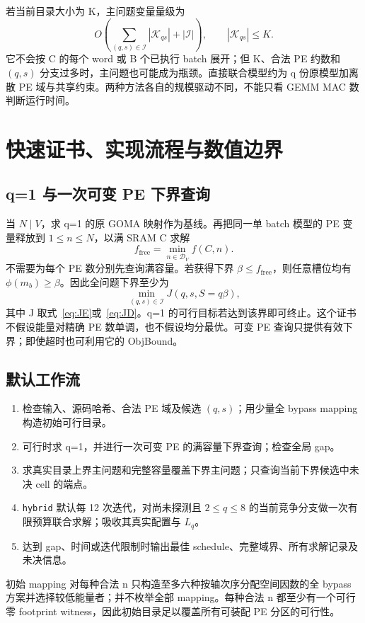 \documentclass[UTF8,11pt,a4paper,fontset=fandol]{ctexart}
\theoremstyle{remark}\newtheorem{remark}[proposition]{说明}
\numberwithin{equation}{section}
\begin{document}
若当前目录大小为 K，主问题变量量级为
\begin{equation}
O\left(\sum_{(q,s)\in\mathcal I}|\mathcal K_{qs}|+|\mathcal I|\right),
\qquad |\mathcal K_{qs}|\le K.
\end{equation}
它不会按 C 的每个 word 或 B 个已执行 batch 展开；但 K、合法 PE 约数和 $(q,s)$ 分支过多时，主问题也可能成为瓶颈。直接联合模型约为 q 份原模型加离散 PE 域与共享约束。两种方法各自的规模驱动不同，不能只看 GEMM MAC 数判断运行时间。

\section{快速证书、实现流程与数值边界}
\label{sec:implementation}
\subsection{q=1 与一次可变 PE 下界查询}
当 $N\mid V$，求 q=1 的原 GOMA 映射作为基线。再把同一单 batch 模型的 PE 变量释放到 $1\le n\le N$，以满 SRAM C 求解
\begin{equation}
f_{\mathrm{free}}=\min_{n\in\mathcal D_V}f(C,n).
\end{equation}
不需要为每个 PE 数分别先查询满容量。若获得下界 $\beta\le f_{\mathrm{free}}$，则任意槽位均有 $\phi(m_b)\ge\beta$。因此全问题下界至少为
\begin{equation}
\min_{(q,s)\in\mathcal I} J(q,s,S=q\beta),
\label{eq:free-lb}
\end{equation}
其中 J 取式~\eqref{eq:JE}或~\eqref{eq:JD}。q=1 的可行目标若达到该界即可终止。这个证书不假设能量对精确 PE 数单调，也不假设均分最优。可变 PE 查询只提供有效下界；即使超时也可利用它的 ObjBound。

\subsection{默认工作流}
\begin{enumerate}
\item 检查输入、源码哈希、合法 PE 域及候选 $(q,s)$；用少量全 bypass mapping 构造初始可行目录。
\item 可行时求 q=1，并进行一次可变 PE 的满容量下界查询；检查全局 gap。
\item 求真实目录上界主问题和完整容量覆盖下界主问题；只查询当前下界候选中未决 cell 的端点。
\item \texttt{hybrid} 默认每 12 次迭代，对尚未探测且 $2\le q\le8$ 的当前竞争分支做一次有限预算联合求解；吸收其真实配置与 $L_q$。
\item 达到 gap、时间或迭代限制时输出最佳 schedule、完整域界、所有求解记录及未决信息。
\end{enumerate}
初始 mapping 对每种合法 n 只构造至多六种按轴次序分配空间因数的全 bypass 方案并选择较低能量者；并不枚举全部 mapping。每种合法 n 都至少有一个可行零 footprint witness，因此初始目录足以覆盖所有可装配 PE 分区的可行性。
\end{document}
